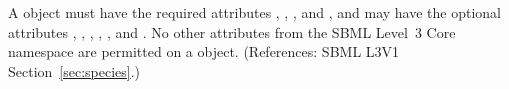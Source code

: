 A \Species object must have the required attributes ,
, ,
 and , and may have the optional
attributes , , ,
, , 
and .  No other attributes from the SBML Level~3
Core namespace are permitted on a \Species object.  (References: SBML L3V1
Section~\ref{sec:species}.)
